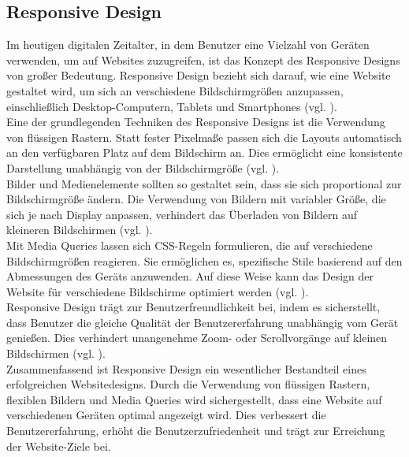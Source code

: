 \documentclass[fontsize=12pt,openright,oneside,paper=a4,BCOR=1cm]{scrbook}
\begin{document}
\subsection{Responsive Design}
Im heutigen digitalen Zeitalter, in dem Benutzer eine Vielzahl von Geräten verwenden, um auf Websites zuzugreifen, ist das Konzept des Responsive Designs von großer Bedeutung. Responsive Design bezieht sich darauf, wie eine Website gestaltet wird, um sich an verschiedene Bildschirmgrößen anzupassen, einschließlich Desktop-Computern, Tablets und Smartphones (vgl. \cite{almeida2017role}).	\\

Eine der grundlegenden Techniken des Responsive Designs ist die Verwendung von flüssigen Rastern. Statt fester Pixelmaße passen sich die Layouts automatisch an den verfügbaren Platz auf dem Bildschirm an. Dies ermöglicht eine konsistente Darstellung unabhängig von der Bildschirmgröße (vgl. \cite{kadlec2012implementing}).\\

Bilder und Medienelemente sollten so gestaltet sein, dass sie sich proportional zur Bildschirmgröße ändern. Die Verwendung von Bildern mit variabler Größe, die sich je nach Display anpassen, verhindert das Überladen von Bildern auf kleineren Bildschirmen (vgl. \cite{kadlec2012implementing}). \\

Mit Media Queries lassen sich CSS-Regeln formulieren, die auf verschiedene Bildschirmgrößen reagieren. Sie ermöglichen es, spezifische Stile basierend auf den Abmessungen des Geräts anzuwenden. Auf diese Weise kann das Design der Website für verschiedene Bildschirme optimiert werden (vgl. \cite{kadlec2012implementing}). \\

Responsive Design trägt zur Benutzerfreundlichkeit bei, indem es sicherstellt, dass Benutzer die gleiche Qualität der Benutzererfahrung unabhängig vom Gerät genießen. Dies verhindert unangenehme Zoom- oder Scrollvorgänge auf kleinen Bildschirmen (vgl. \cite{activeweb}). \\

Zusammenfassend ist Responsive Design ein wesentlicher Bestandteil eines erfolgreichen Websitedesigns. Durch die Verwendung von flüssigen Rastern, flexiblen Bildern und Media Queries wird sichergestellt, dass eine Website auf verschiedenen Geräten optimal angezeigt wird. Dies verbessert die Benutzererfahrung, erhöht die Benutzerzufriedenheit und trägt zur Erreichung der Website-Ziele bei.
\end{document}
